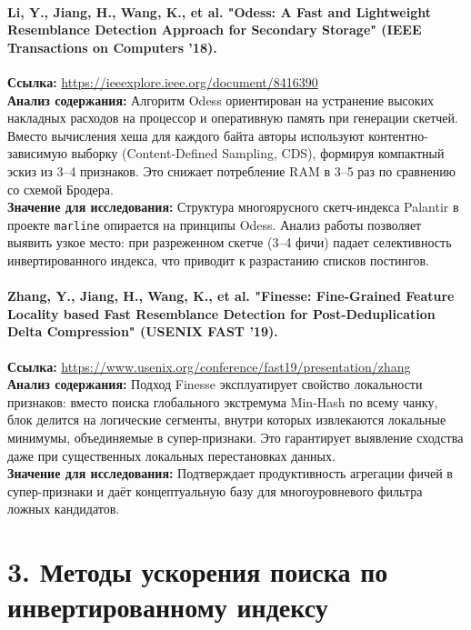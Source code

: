 \documentclass[a4paper,14pt]{extarticle}
\begin{document}
\paragraph{Li, Y., Jiang, H., Wang, K., et al. "Odess: A Fast and Lightweight Resemblance Detection Approach for Secondary Storage" (IEEE Transactions on Computers '18).}
\textbf{Ссылка:} \url{https://ieeexplore.ieee.org/document/8416390} \\
\textbf{Анализ содержания:} Алгоритм Odess ориентирован на устранение высоких накладных расходов на процессор и оперативную память при генерации скетчей. Вместо вычисления хеша для каждого байта авторы используют контентно-зависимую выборку (Content-Defined Sampling, CDS), формируя компактный эскиз из 3--4 признаков. Это снижает потребление RAM в 3--5 раз по сравнению со схемой Бродера. \\
\textbf{Значение для исследования:} Структура многоярусного скетч-индекса Palantir в проекте \texttt{marline} опирается на принципы Odess. Анализ работы позволяет выявить узкое место: при разреженном скетче (3--4 фичи) падает селективность инвертированного индекса, что приводит к разрастанию списков постингов.

\paragraph{Zhang, Y., Jiang, H., Wang, K., et al. "Finesse: Fine-Grained Feature Locality based Fast Resemblance Detection for Post-Deduplication Delta Compression" (USENIX FAST '19).}
\textbf{Ссылка:} \url{https://www.usenix.org/conference/fast19/presentation/zhang} \\
\textbf{Анализ содержания:} Подход Finesse эксплуатирует свойство локальности признаков: вместо поиска глобального экстремума Min-Hash по всему чанку, блок делится на логические сегменты, внутри которых извлекаются локальные минимумы, объединяемые в супер-признаки. Это гарантирует выявление сходства даже при существенных локальных перестановках данных. \\
\textbf{Значение для исследования:} Подтверждает продуктивность агрегации фичей в супер-признаки и даёт концептуальную базу для многоуровневого фильтра ложных кандидатов.

\section*{3. Методы ускорения поиска по инвертированному индексу}
\end{document}
